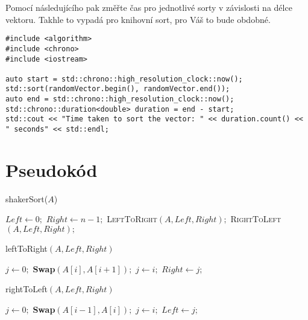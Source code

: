 \documentclass[12pt,oneside]{article}
\begin{document}
Pomocí následujícího pak změřte čas pro jednotlivé sorty v závislosti na délce vektoru.
Takhle to vypadá pro knihovní sort, pro Váš to bude obdobné.
\begin{lstlisting}
#include <algorithm>
#include <chrono>
#include <iostream>

auto start = std::chrono::high_resolution_clock::now();
std::sort(randomVector.begin(), randomVector.end());
auto end = std::chrono::high_resolution_clock::now();
std::chrono::duration<double> duration = end - start;
std::cout << "Time taken to sort the vector: " << duration.count() << " seconds" << std::endl;
\end{lstlisting}

\appendix

\section{Pseudokód}

	\begin{algorithm}
	\caption{shakerSort($A$)}
	\begin{algorithmic}[1]
		\State $Left \gets 0;$
		\State $Right \gets n - 1;$
		\Repeat
		\State \textsc{LeftToRight}$(A, Left, Right);$
		\State \textsc{RightToLeft}$(A, Left, Right);$
	\end{algorithmic}
	\label{alg:shaker}
\end{algorithm}

\begin{algorithm}
	\label{alg:LR}
	\caption{leftToRight$(A, Left, Right)$}
	\begin{algorithmic}[1]
		\State $j \gets 0;$
		\State \textbf{Swap}$(A[i], A[i + 1]);$
		\State $j \gets i;$
		\EndIf
		\EndFor
		\State $Right \gets j;$
	\end{algorithmic}
\end{algorithm}


\begin{algorithm}
	\label{alg:RL}
	\caption{rightToLeft$(A, Left, Right)$}
	\begin{algorithmic}[1]
		\State $j \gets 0;$
		\State \textbf{Swap}$(A[i - 1], A[i]);$
		\State $j \gets i;$
		\EndIf
		\EndFor
		\State $Left \gets j;$
	\end{algorithmic}
\end{algorithm}
	
\end{document}
